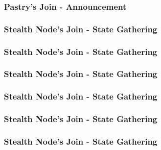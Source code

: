 \documentclass{beamer}
\begin{document}
\begin{frame}
  \frametitle{Pastry's Join - Announcement}
  \begin{center}
  \end{center}
\end{frame}


\begin{frame}
  \frametitle{Stealth Node's Join - State Gathering}
  \begin{center}
  \end{center}
\end{frame}

\begin{frame}
  \frametitle{Stealth Node's Join - State Gathering}
  \begin{center}
  \end{center}
\end{frame}

\begin{frame}
  \frametitle{Stealth Node's Join - State Gathering}
  \begin{center}
  \end{center}
\end{frame}

\begin{frame}
  \frametitle{Stealth Node's Join - State Gathering}
  \begin{center}
  \end{center}
\end{frame}

\begin{frame}
  \frametitle{Stealth Node's Join - State Gathering}
  \begin{center}
  \end{center}
\end{frame}

\begin{frame}
  \frametitle{Stealth Node's Join - State Gathering}
  \begin{center}
  \end{center}
\end{frame}
\end{document}
